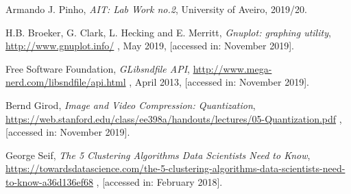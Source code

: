 \documentclass[12pt]{article}
\begin{document}
\begin{thebibliography}{9}
  

    Armando J. Pinho,
    \textit{AIT: Lab Work no.2},
    University of Aveiro,
    2019/20.
  
    H.B. Broeker, G. Clark, L. Hecking and E. Merritt,
    \textit{Gnuplot: graphing utility},
    \url{http://www.gnuplot.info/} ,
    May 2019,
    [accessed in: November 2019].

    Free Software Foundation,
    \textit{GLibsndfile API},
    \url{http://www.mega-nerd.com/libsndfile/api.html} ,
    April 2013,
    [accessed in: November 2019].

    Bernd Girod,
    \textit{Image and Video Compression: Quantization},
    \url{https://web.stanford.edu/class/ee398a/handouts/lectures/05-Quantization.pdf} ,
    [accessed in: November 2019].

    George Seif,
    \textit{The 5 Clustering Algorithms Data Scientists Need to Know},
    \url{https://towardsdatascience.com/the-5-clustering-algorithms-data-scientists-need-to-know-a36d136ef68} ,
    [accessed in: February 2018].
    

\end{thebibliography}

\clearpage
\end{document}
